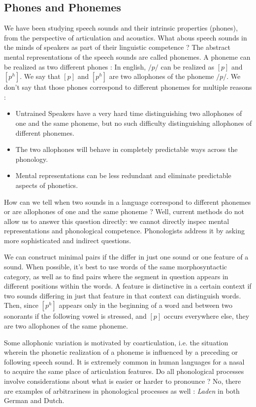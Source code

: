 \documentclass{cours}
\begin{document}
\subsection{Phones and Phonemes}
We have been studying speech sounds and their intrinsic properties (phones), from the perspective of articulation and acoustics. What abous speech sounds in the minds of speakers as part of their linguistic competence ? The abstract mental representations of the speech sounds are called phonemes.
A phoneme can be realized as two different phones : In english, $/p/$ can be realized as $[p]$ and $[p^{h}]$. We say that $[p]$ and $[p^{h}]$ are two allophones of the phoneme $/p/$. 
We don't say that those phones correspond to different phonemes for multiple reasons : 
\begin{itemize}
    \item Untrained Speakers have a very hard time distinguishing two allophones of one and the same phoneme, but no such difficulty distinguishing allophones of different phonemes. 
    \item The two allophones will behave in completely predictable ways across the phonology.
    \item Mental representations can be less redundant and eliminate predictable aspects of phonetics. 
\end{itemize}
How can we tell when two sounds in a language correspond to different phonemes or are allophones of one and the same phoneme ? Well, current methods do not allow us to answer this question directly: we cannot directly inspec mental representations and phonological competence. Phonologists address it by asking more sophisticated and indirect questions.

We can construct minimal pairs if the differ in just one sound or one feature of a sound. When possible, it's best to use words of the same morphosyntactic category, as well as to find pairs where the segment in question appears in different positions within the words. A feature is distinctive in a certain context if two sounds differing in just that feature in that context can distinguish words. 
Then, since $[p^{h}]$ appears only in the beginning of a word and between two sonorants if the following vowel is stressed, and $[p]$ occurs everywhere else, they are two allophones of the same phoneme. 

Some allophonic variation is motivated by coarticulation, i.e. the situation wherein the phonetic realization of a phoneme is influenced by a preceding or following speech sound. 
It is extremely common in human languages for a nasal to acquire the same place of articulation features. Do all phonological processes involve considerations about what is easier or harder to pronounce ? No, there are examples of arbitrariness in phonological processes as well : \textsl{Laden} in both German and Dutch.
\end{document}

